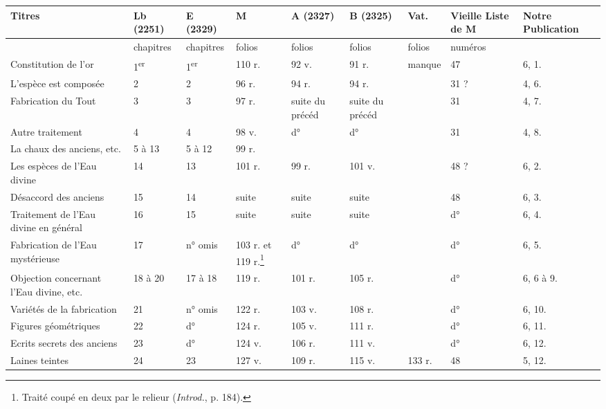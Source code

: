 \documentclass[a4paper, 11pt, oneside, polutonikogreek, french]{article}
\begin{document}
\begin{center}
    \scriptsize
    \begin{longtable}{|p{20mm}|p{11mm}|p{11mm}|p{11mm}|p{11mm}|p{11mm}|p{11mm}|p{11mm}|p{15mm}|}
\hline
        \textbf{Titres} & \textbf{Lb (2251)} & \textbf{E (2329)} & \textbf{M} & \textbf{A (2327)} & \textbf{B (2325)} & \textbf{Vat.} & \textbf{Vieille Liste de M} & \textbf{Notre Publication} \\ \hline
        ~ & chapitres & chapitres & folios & folios & folios & folios & numéros & ~ \\ \hline
        Constitution de l'or & 1\textsuperscript{er} & 1\textsuperscript{er} & 110 r. & 92 v. & 91 r. & manque & 47 & 6, 1. \\ \hline
        L'espèce est composée & 2 & 2 & 96 r. & 94 r. & 94 r. & ~ & 31 ? & 4, 6. \\ \hline
        Fabrication du Tout & 3 & 3 & 97 r. & suite du précéd & suite du précéd & ~ & 31 & 4, 7. \\ \hline
        Autre traitement & 4 & 4 & 98 v. & d° & d° & ~ & 31 & 4, 8. \\ \hline
        La chaux des anciens, etc. & 5 à 13 & 5 à 12 & 99 r. & ~ & ~ & ~ & ~ & ~ \\ \hline
        Les espèces de l'Eau divine & 14 & 13 & 101 r. & 99 r. & 101 v. & ~ & 48 ? & 6, 2. \\ \hline
        Désaccord des anciens & 15 & 14 & suite & suite & suite & ~ & 48 & 6, 3. \\ \hline
        Traitement de l'Eau divine en général & 16 & 15 & suite & suite & suite & ~ & d° & 6, 4. \\ \hline
        Fabrication de l'Eau mystérieuse & 17 & n° omis & 103 r. et 119 r.\footnote{Traité coupé en deux par le relieur (\emph{Introd.}, p. 184).} & d° & d° & ~ & d° & 6, 5. \\ \hline
        Objection concernant l'Eau divine, etc. & 18 à 20 & 17 à 18 & 119 r. & 101 r. & 105 r. & ~ & d° & 6, 6 à 9. \\ \hline
        Variétés de la fabrication & 21 & n° omis & 122 r. & 103 v. & 108 r. & ~ & d° & 6, 10. \\ \hline
        Figures géométriques & 22 & d° & 124 r. & 105 v. & 111 r. & ~ & d° & 6, 11. \\ \hline
        Ecrits secrets des anciens & 23 & d° & 124 v. & 106 r. & 111 v. & ~ & d° & 6, 12. \\ \hline
        Laines teintes & 24 & 23 & 127 v. & 109 r. & 115 v. & 133 r. & 48 & 5, 12. \\ \hline

\end{longtable}
\end{center}
\end{document}

